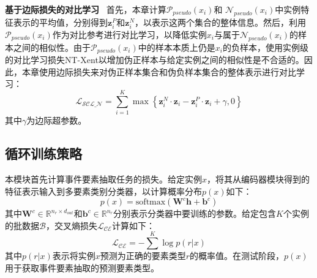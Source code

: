 \textbf{基于边际损失的对比学习}~
首先，本章计算$\mathcal{P}_{pseudo}\left(x_{i}\right)$和 $\mathcal{N}_{pseudo}\left(x_{i}\right)$中实例特征表示的平均值，分别得到$\boldsymbol{z}_{i}^{P}$和$\boldsymbol{z}_{i}^{N}$，以表示这两个集合的整体信息。然后，利用$\mathcal{P}_{pseudo}\left(x_{i}\right)$作为对比参考进行对比学习，以降低实例$x_{i}$与属于$\mathcal{N}_{pseudo}\left(x_{i}\right)$的样本之间的相似性。由于$\mathcal{P}_{pseudo}\left(x_{i}\right)$中的样本本质上仍是$x_{i}$的负样本，使用实例级的对比学习损失NT-Xent以增加伪正样本与给定实例之间的相似性是不合适的。因此，本章使用边际损失来对伪正样本集合和伪负样本集合的整体表示进行对比学习：
\begin{equation}
\label{eq21}
  \mathcal{L_\textrm{SCL\_N}} =\sum_{i=1}^{K} \max \left\{\boldsymbol{z}_{i}^{N} \cdot \boldsymbol{z}_{i}-\boldsymbol{z}_{i}^{P} \cdot \boldsymbol{z}_{i}+\gamma, 0\right\}
\end{equation}
其中$\gamma$为边际超参数。

\subsection{循环训练策略}
本模块首先计算事件要素抽取任务的损失。给定实例$x$，将其从编码器模块得到的特征表示输入到多要素类别分类器，以计算概率分布$p\left(x\right)$如下：
\begin{equation}
  p\left(x\right) = \textrm{softmax}\left(\boldsymbol{W}^{c}\boldsymbol{h} + \boldsymbol{b}^{c}\right)
 \label{eq3}
\end{equation}
其中$\boldsymbol{W}^{c} \in {\mathbb{R}}^{n_{r} \times d_{out}}$和$\boldsymbol{b}^{c} \in {\mathbb{R}}^{n_{r}}$分别表示分类器中要训练的参数。给定包含$K$个实例的批数据$\mathcal{B}$，交叉熵损失$\mathcal{L_\textrm{CE}}$计算如下：
\begin{equation}
  \mathcal{L_\textrm{CE}} = -\sum^{K} \log p\left(r|x\right)
 \label{ce}
\end{equation}
其中$p\left(r|x\right)$表示将实例$x$预测为正确的要素类型$r$的概率值。在测试阶段，$p\left(x\right)$用于获取事件要素抽取的预测要素类型。

